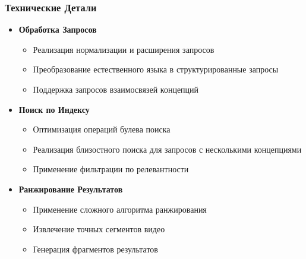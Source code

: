 \documentclass[12pt,a4paper]{article}
\begin{document}
\subsubsection{Технические Детали}
\begin{itemize}
    \item \textbf{Обработка Запросов}
    \begin{itemize}
        \item Реализация нормализации и расширения запросов
        \item Преобразование естественного языка в структурированные запросы
        \item Поддержка запросов взаимосвязей концепций
    \end{itemize}

    \item \textbf{Поиск по Индексу}
    \begin{itemize}
        \item Оптимизация операций булева поиска
        \item Реализация близостного поиска для запросов с несколькими концепциями
        \item Применение фильтрации по релевантности
    \end{itemize}

    \item \textbf{Ранжирование Результатов}
    \begin{itemize}
        \item Применение сложного алгоритма ранжирования
        \item Извлечение точных сегментов видео
        \item Генерация фрагментов результатов
    \end{itemize}
\end{itemize}
\end{document}
